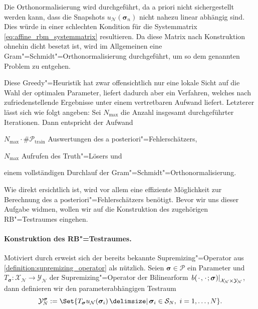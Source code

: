 \documentclass[../main.tex]{subfiles}
\begin{document}
Die Orthonormalisierung wird durchgeführt, da a priori nicht sichergestellt werden kann, dass die Snapshots $u_{\mathcal N}(\bm \sigma_n)$ nicht nahezu linear abhängig sind.
Dies würde in einer schlechten Kondition für die Systemmatrix \cref{eq:affine_rbm_systemmatrix} resultieren.
Da diese Matrix nach Konstruktion ohnehin dicht besetzt ist, wird im Allgemeinen eine Gram"=Schmidt"=Orthonormalisierung durchgeführt, um so dem genannten Problem zu entgehen.

Diese Greedy"=Heuristik hat zwar offensichtlich nur eine lokale Sicht auf die Wahl der optimalen Parameter, liefert dadurch aber ein Verfahren, welches nach \cite[Subsection 3.4.3]{Patera:2007un} zufriedenstellende Ergebnisse unter einem vertretbaren Aufwand liefert.
Letzterer lässt sich wie folgt angeben: Sei $N_{\max}$ die Anzahl insgesamt durchgeführter Iterationen.
Dann entspricht der Aufwand
\begin{inlinelist}
    \item $N_{\max} \cdot \# \mathcal P_{\mathrm{train}}$ Auswertungen des a posteriori"=Fehlerschätzers,
    \item $N_{\max}$ Aufrufen des Truth"=Lösers und
    \item einem vollständigen Durchlauf der Gram"=Schmidt"=Orthonormalisierung.
\end{inlinelist}

Wie direkt ersichtlich ist, wird vor allem eine effiziente Möglichkeit zur Berechnung des a posteriori"=Fehlerschätzers benötigt.
Bevor wir uns dieser Aufgabe widmen, wollen wir auf die Konstruktion des zugehörigen RB"=Testraumes eingehen.


\paragraph{Konstruktion des RB"=Testraumes.} %
\label{par:konstruktion_des_testraumes_}

Motiviert durch \cite{2014arXiv1408.2709M} erweist sich der bereits bekannte Supremizing"=Operator aus \cref{definition:supremizing_operator} als nützlich.
Seien $\bm \sigma \in \mathcal P$ ein Parameter und $T_{\bm \sigma} \colon \mathcal X_{\mathcal N} \to \mathcal Y_{\mathcal N}$ der Supremizing"=Operator der Bilinearform $\left.b({\mkern2mu\cdot\mkern2mu}, {\mkern2mu\cdot\mkern2mu}; \bm \sigma)\right|_{\mathcal X_{\mathcal N} \times \mathcal Y_{\mathcal N}}$, dann definieren wir den parameterabhängigen Testraum
\begin{equation}\label{eq:rb_testraum_parameterabhaengig}
    \mathcal Y_{N}^{\bm \sigma} := \Set{ T_{\bm \sigma} u_{\mathcal N}(\bm \sigma_{i}) \given \bm \sigma_{i} \in \mathcal S_{N},~ i = 1, \dots, N }.
\end{equation}
\end{document}
